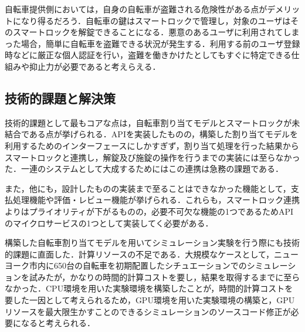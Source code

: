       \par 自転車提供側においては，自身の自転車が盗難される危険性がある点がデメリットになり得るだろう．自転車の鍵はスマートロックで管理し，対象のユーザはそのスマートロックを解錠できることになる．悪意のあるユーザに利用されてしまった場合，簡単に自転車を盗難できる状況が発生する．利用する前のユーザ登録時などに厳正な個人認証を行い，盗難を働きかけたとしてもすぐに特定できる仕組みや抑止力が必要であると考えらえる．
      
  \subsection{技術的課題と解決策}
    \label{sec:技術的課題と解決策}
      \par 技術的課題として最もコアな点は，自転車割り当てモデルとスマートロックが未結合である点が挙げられる．APIを実装したものの，構築した割り当てモデルを利用するためのインターフェースにしかすぎず，割り当て処理を行った結果からスマートロックと連携し，解錠及び施錠の操作を行うまでの実装には至らなかった．一連のシステムとして大成するためにはこの連携は急務の課題である．
      \par また，他にも，設計したものの実装まで至ることはできなかった機能として，支払処理機能や評価・レビュー機能が挙げられる．これらも，スマートロック連携よりはプライオリティが下がるものの，必要不可欠な機能の1つであるためAPIのマイクロサービスの1つとして実装してく必要がある．
      \par 構築した自転車割り当てモデルを用いてシミュレーション実験を行う際にも技術的課題に直面した．計算リソースの不足である．大規模なケースとして，ニューヨーク市内に650台の自転車を初期配置したシチュエーションでのシミュレーションを試みたが，かなりの時間的計算コストを要し，結果を取得するまでに至らなかった．CPU環境を用いた実験環境を構築したことが，時間的計算コストを要した一因として考えられるため，GPU環境を用いた実験環境の構築と，GPUリソースを最大限生かすことのできるシミュレーションのソースコード修正が必要になると考えられる．
      
